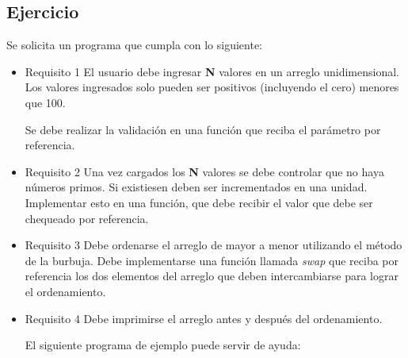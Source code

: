 \subsection{Ejercicio}
Se solicita un programa que cumpla con lo siguiente:
\begin{itemize}[a)]
  \item Requisito 1
    El usuario debe ingresar \textbf{N} valores en un arreglo unidimensional. Los valores ingresados solo pueden ser positivos (incluyendo el cero) menores que 100.

    Se debe realizar la validación en una función que reciba el parámetro por referencia.

  \item Requisito 2
    Una vez cargados los \textbf{N} valores se debe controlar que no haya números primos. Si existiesen deben ser incrementados en una unidad. Implementar esto en una función,
    que debe recibir el valor que debe ser chequeado por referencia.

  \item Requisito 3
    Debe ordenarse el arreglo de mayor a menor utilizando el método de la burbuja. Debe implementarse una función llamada \textit{swap}
    que reciba por referencia los dos elementos del arreglo que deben intercambiarse para lograr el ordenamiento.

  \item Requisito 4
    Debe imprimirse el arreglo antes y después del ordenamiento.


    El siguiente programa de ejemplo puede servir de ayuda:
    \pagebreak

    \lstset{inputencoding=utf8/latin1}
    
\end{itemize}

